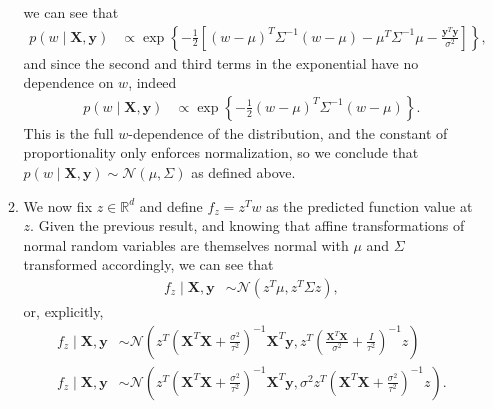 \documentclass[11pt,letterpaper]{article}
\newcommand{\R}{\mathbb{R}}
\theoremstyle{definition}
\theoremstyle{plain}
\newcommand{\prop}{\mathrel{\propto}}
\renewcommand{\vec}[1]{\bm{#1}}
\numberwithin{equation}{section}
\numberwithin{figure}{section}
\begin{document}
\begin{enumerate}
\begin{enumerate}
		we can see that
		\begin{align*}
			p(w \mid \vec{X},\vec{y}) &\prop \exp\left\{-\frac{1}{2}\left[(w-\mu)^T \Sigma^{-1} (w-\mu) - \mu^T \Sigma^{-1} \mu - \frac{\vec{y}^T \vec{y}}{\sigma^2}\right]\right\},
		\end{align*}
		and since the second and third terms in the exponential have no dependence on $w$, indeed
		\begin{align*}
			p(w \mid \vec{X},\vec{y}) &\prop \exp\left\{-\frac{1}{2}(w-\mu)^T \Sigma^{-1} (w-\mu)\right\}.
		\end{align*}
		This is the full $w$-dependence of the distribution, and the constant of proportionality only enforces normalization, so we conclude that $p(w\mid \vec{X},\vec{y}) \sim \mathcal{N}(\mu,\Sigma)$ as defined above.

		\item We now fix $z \in \R^d$ and define $f_z = z^T w$ as the predicted function value at $z$. Given the previous result, and knowing that affine transformations of normal random variables are themselves normal with $\mu$ and $\Sigma$ transformed accordingly, we can see that
		\begin{align*}
			f_z \mid \vec{X},\vec{y} &\sim \mathcal{N}\left(z^T \mu, z^T \Sigma z\right),
		\end{align*}
		or, explicitly,
		\begin{align*}
			f_z \mid \vec{X},\vec{y} &\sim \mathcal{N}\left(z^T \left(\vec{X}^T \vec{X} + \tfrac{\sigma^2}{\tau^2}\right)^{-1} \vec{X}^T \vec{y}, z^T \left(\tfrac{\vec{X}^T \vec{X}}{\sigma^2} + \tfrac{I}{\tau^2}\right)^{-1} z\right)\\
			f_z \mid \vec{X},\vec{y} &\sim \mathcal{N}\left(z^T \left(\vec{X}^T \vec{X} + \tfrac{\sigma^2}{\tau^2}\right)^{-1} \vec{X}^T \vec{y}, \sigma^2 z^T \left(\vec{X}^T \vec{X} + \tfrac{\sigma^2}{\tau^2}\right)^{-1} z\right).
		\end{align*}





\end{enumerate}
\end{enumerate}
\end{document}
